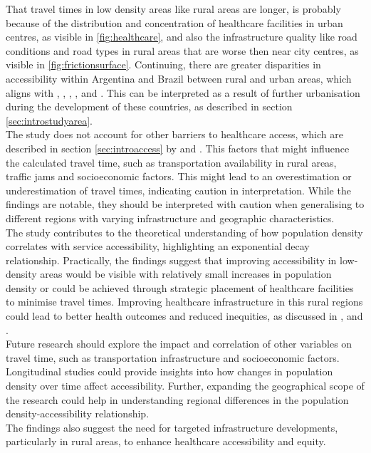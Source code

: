\documentclass[11pt, a4paper]{report}
\begin{document}
That travel times in low density areas like rural areas are longer, is probably because of the distribution and concentration of healthcare facilities in urban centres, as visible in \ref{fig:healthcare}, and also the infrastructure quality like road conditions and road types in rural areas that are worse then near city centres, as visible in \ref{fig:frictionsurface}. Continuing, there are greater disparities in accessibility within Argentina and Brazil between rural and urban areas, which aligns with \cite{gilardino_access_2016}, \cite{palacios_need_2020}, \cite{vacarezza_exploring_2023}, \cite{hone_effect_2019}, \cite{silva_emergency_2021} and \cite{palmeira_analysis_2022}. This can be interpreted as a result of further urbanisation during the development of these countries, as described in section \ref{sec:introstudyarea}. \\
%
The study does not account for other barriers to healthcare access, which are described in section \ref{sec:introaccess} by \cite{wang_assessing_2005} and \cite{carrillo_defining_2011}. This factors that might influence the calculated travel time, such as transportation availability in rural areas, traffic jams and socioeconomic factors. This might lead to an overestimation or underestimation of travel times, indicating caution in interpretation. 
While the findings are notable, they should be interpreted with caution when generalising to different regions with varying infrastructure and geographic characteristics. \\
%
The study contributes to the theoretical understanding of how population density correlates with service accessibility, highlighting an exponential decay relationship. Practically, the findings suggest that improving accessibility in low-density areas would be visible with relatively small increases in population density or could be achieved through strategic placement of healthcare facilities to minimise travel times. Improving healthcare infrastructure in this rural regions could lead to better health outcomes and reduced inequities, as discussed in \citet{syed_traveling_2013}, \cite{davy_access_2016} and \cite{zhao_economic_2016}.\\
%
Future research should explore the impact and correlation of other variables on travel time, such as transportation infrastructure and socioeconomic factors. Longitudinal studies could provide insights into how changes in population density over time affect accessibility. Further, expanding the geographical scope of the research could help in understanding regional differences in the population density-accessibility relationship.\\
%
The findings also suggest the need for targeted infrastructure developments, particularly in rural areas, to enhance healthcare accessibility and equity.
\end{document}
